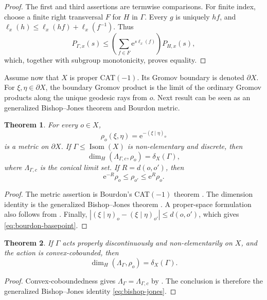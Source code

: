 \documentclass[11pt]{article}
\newtheorem{theorem}{Theorem}[section]
\theoremstyle{definition}
\newcommand{\Isom}{\operatorname{Isom}}
\newcommand{\e}{\mathrm e}
\begin{document}
\begin{proof}
The first and third assertions are termwise comparisons.  For finite index, choose a finite
right transversal $F$ for $H$ in $\Gamma$.  Every $g$ is uniquely $hf$, and
$\ell_x(h)\le\ell_x(hf)+\ell_x(f^{-1})$.  Thus
\[
 P_{\Gamma,x}(s)
 \le \left(\sum_{f\in F}\e^{s\ell_x(f)}\right)P_{H,x}(s),
\]
which, together with subgroup monotonicity, proves equality.
\end{proof}

Assume now that $X$ is proper CAT$(-1)$.  Its Gromov boundary is denoted $\partial X$.
For $\xi,\eta\in\partial X$, the boundary Gromov product is the limit of the ordinary
Gromov products along the unique geodesic rays from $o$.
Next result can be seen as an generalized Bishop--Jones theorem and Bourdon metric.
\begin{theorem}
\label{thm:bishop-jones}
For every $o\in X$,
\[
 \rho_o(\xi,\eta)=\e^{-(\xi\mid\eta)_o}
\]
is a metric on $\partial X$.  If $\Gamma\le\Isom(X)$ is non-elementary and discrete, then
\begin{equation}\label{eq:bishop-jones}
 \dim_H(\Lambda_{\Gamma,c},\rho_o)=\delta_X(\Gamma),
\end{equation}
where $\Lambda_{\Gamma,c}$ is the conical limit set.  If $R=d(o,o')$, then
\begin{equation}\label{eq:bourdon-basepoint}
 \e^{-R}\rho_o\le\rho_{o'}\le\e^R\rho_o.
\end{equation}
\end{theorem}

\begin{proof}
The metric assertion is Bourdon's CAT$(-1)$ theorem \cite{Bourdon1995}.  The dimension
identity is the generalized Bishop--Jones theorem
\cite[Theorem~1.2.1]{DasSimmonsUrbanski2017}. A proper-space formulation also follows from
\cite{Cavallucci2025}.  Finally,
$|(\xi\mid\eta)_o-(\xi\mid\eta)_{o'}|\le d(o,o')$, which gives
\eqref{eq:bourdon-basepoint}.
\end{proof}

\begin{theorem}
\label{thm:bourdon-coornaert}
If $\Gamma$ acts properly discontinuously and non-elementarily on $X$, and the action is
convex-cobounded,
then
\begin{equation}\label{eq:coornaert-dimension}
 \dim_H(\Lambda_\Gamma,\rho_o)=\delta_X(\Gamma).
\end{equation}
\end{theorem}

\begin{proof}
Convex-coboundedness gives
$\Lambda_\Gamma=\Lambda_{\Gamma,c}$ by
\cite[Theorem~12.2.7]{DasSimmonsUrbanski2017}.  The conclusion is therefore the generalized
Bishop--Jones identity \eqref{eq:bishop-jones}.
\end{proof}
\end{document}
